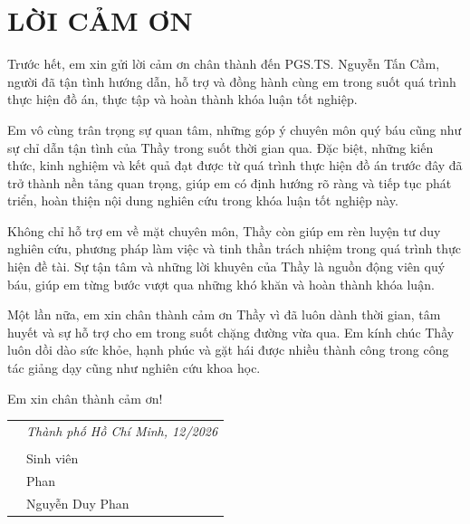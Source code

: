 \chapter*{LỜI CẢM ƠN}
\vspace*{1.5ex}

Trước hết, em xin gửi lời cảm ơn chân thành đến PGS.TS. Nguyễn Tấn Cầm, người đã tận tình hướng
dẫn, hỗ trợ và đồng hành cùng em trong suốt quá trình thực hiện đồ án, thực tập và hoàn thành khóa
luận tốt nghiệp.

Em vô cùng trân trọng sự quan tâm, những góp ý chuyên môn quý báu cũng như sự chỉ dẫn tận tình của
Thầy trong suốt thời gian qua. Đặc biệt, những kiến thức, kinh nghiệm và kết quả đạt được từ quá
trình thực hiện đồ án trước đây đã trở thành nền tảng quan trọng, giúp em có định hướng rõ ràng và
tiếp tục phát triển, hoàn thiện nội dung nghiên cứu trong khóa luận tốt nghiệp này.

Không chỉ hỗ trợ em về mặt chuyên môn, Thầy còn giúp em rèn luyện tư duy nghiên cứu, phương pháp
làm việc và tinh thần trách nhiệm trong quá trình thực hiện đề tài. Sự tận tâm và những lời khuyên
của Thầy là nguồn động viên quý báu, giúp em từng bước vượt qua những khó khăn và hoàn thành khóa
luận.

Một lần nữa, em xin chân thành cảm ơn Thầy vì đã luôn dành thời gian, tâm huyết và sự hỗ trợ cho em
trong suốt chặng đường vừa qua. Em kính chúc Thầy luôn dồi dào sức khỏe, hạnh phúc và gặt hái được
nhiều thành công trong công tác giảng dạy cũng như nghiên cứu khoa học.

Em xin chân thành cảm ơn!

{
\begin{table}[ht]
	\centering
	\begin{tabular}{>{\centering}m{}>{\centering\arraybackslash}m{}}
		 & \textit{Thành phố Hồ Chí Minh, 12/2026} \\ & \\
		 & Sinh viên                               \\
		 & Phan                                    \\
		 & Nguyễn Duy Phan
	\end{tabular}
\end{table}
}
